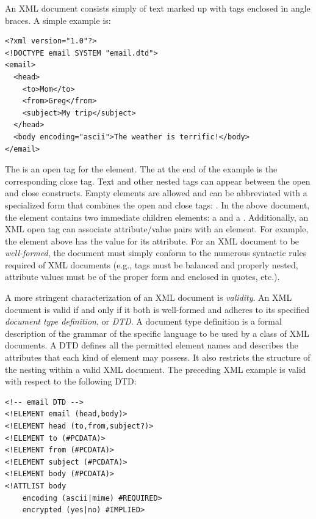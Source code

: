 \documentclass{article}
\begin{document}
An XML document consists simply of text marked up with tags enclosed in
angle braces.  A simple example is:

\begin{verbatim}
<?xml version="1.0"?>
<!DOCTYPE email SYSTEM "email.dtd">
<email>
  <head>
    <to>Mom</to>
    <from>Greg</from>
    <subject>My trip</subject>
  </head>
  <body encoding="ascii">The weather is terrific!</body>
</email>
\end{verbatim}

The  is an open tag for the 
element.  The  at the end of the example is the
corresponding close tag.  Text and other nested tags can appear between
the open and close constructs. Empty elements are allowed and can be abbreviated
with a specialized form that combines the open and close tags: 
.
In the above document, the 
element contains two immediate children elements: a  and a
.  Additionally, an XML open tag can associate
attribute/value pairs with an element.  For example, the  element
above has the value  for its 
attribute.  For an XML document to be \emph{well-formed}, the
document must simply conform to the numerous syntactic rules required of
XML documents (e.g., tags must be balanced and properly nested,
attribute values must be of the proper form and enclosed in quotes,
etc.).

A more stringent characterization of an XML document is
\emph{validity}.  An XML document is valid if and only if it both is
well-formed and adheres to its specified \emph{document type
definition}, or \emph{DTD}.  A document type definition is a
formal description of the grammar of the specific language to be used by
a class of XML documents.  A DTD defines all the permitted element
names and describes the attributes that each kind of element may
possess. It also restricts the structure of the nesting within a valid
XML document.  The preceding XML example is valid with respect to the
following DTD:

\begin{verbatim}
<!-- email DTD -->
<!ELEMENT email (head,body)>
<!ELEMENT head (to,from,subject?)>
<!ELEMENT to (#PCDATA)>
<!ELEMENT from (#PCDATA)>
<!ELEMENT subject (#PCDATA)>
<!ELEMENT body (#PCDATA)>
<!ATTLIST body
    encoding (ascii|mime) #REQUIRED>
    encrypted (yes|no) #IMPLIED>
\end{verbatim}
\end{document}
